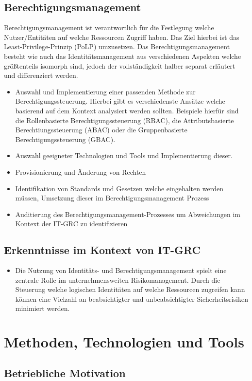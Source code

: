 \documentclass[12pt]{article}
\begin{document}
\subsection{Berechtigungsmanagement}
Berechtigungsmanagement ist verantwortlich für die Festlegung welche Nutzer/Entitäten auf welche Ressourcen Zugriff haben. Das Ziel hierbei ist das Least-Privilege-Prinzip (PoLP) umzusetzen. Das Berechtigungsmanagement besteht wie auch das Identitätsmanagement aus verschiedenen Aspekten welche größtenteils isomorph sind, jedoch der vollständigkeit halber separat erläutert und differenziert werden.
\begin{itemize}
  \item Auswahl und Implementierung einer passenden Methode zur Berechtigungssteuerung. Hierbei gibt es verschiedenste Ansätze welche basierend auf dem Kontext analysiert werden sollten. Beispiele hierfür sind die Rollenbasierte Berechtigungssteuerung (RBAC), die Attributsbasierte Berechtiungssteuerung (ABAC) oder die Gruppenbasierte Berechtigungssteuerung (GBAC).
  \item Auswahl geeigneter Technologien und Tools und Implementierung dieser.
  \item Provisionierung und Änderung von Rechten
  \item Identifikation von Standards und Gesetzen welche eingehalten werden müssen, Umsetzung dieser im Berechtigungsmanagement Prozess
  \item Auditierung des Berechtigungsmanagement-Prozesses um Abweichungen im Kontext der IT-GRC zu identifizieren
\end{itemize}
\subsection{Erkenntnisse im Kontext von IT-GRC}
\begin{itemize}
  \item Die Nutzung von Identitäts- und Berechtigungsmanagement spielt eine zentrale Rolle im unternehmensweiten Risikomanagement. Durch die Steuerung welche logischen Identitäten auf welche Ressourcen zugreifen kann können eine Vielzahl an beabsichtigter und unbeabsichtigter Sicherheitsrisiken minimiert werden.
\end{itemize}
\section{Methoden, Technologien und Tools}
\label{sec:existing}
\subsection{Betriebliche Motivation}
\end{document}
